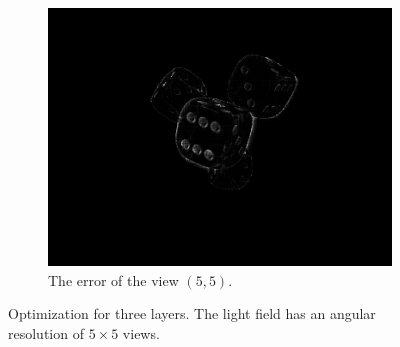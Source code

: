 \documentclass[11pt,a4paper,titlepage]{article}
\begin{document}
\begin{figure}[h]
\begin{subfigure}[t]{0.4\textwidth}
		\includegraphics[width=\textwidth]{results/dice_perspective_rec_3Layers_r=1/custom_view_error.png}
		\caption{The error of the view $\left( 5, 5 \right)$.}
	\end{subfigure}

	\caption{Optimization for three layers. The light field has an angular resolution of $5\times 5$ views.}
\end{figure}
\end{document}
